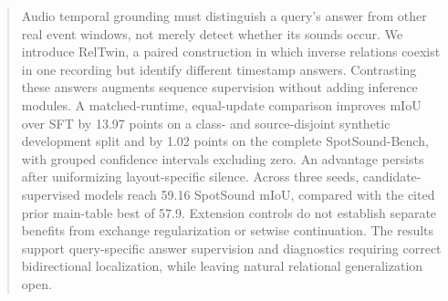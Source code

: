 \begin{abstract}
Audio temporal grounding must distinguish a query's answer from other real event windows, not merely detect whether its sounds occur. We introduce RelTwin, a paired construction in which inverse relations coexist in one recording but identify different timestamp answers. Contrasting these answers augments sequence supervision without adding inference modules. A matched-runtime, equal-update comparison improves mIoU over SFT by 13.97 points on a class- and source-disjoint synthetic development split and by 1.02 points on the complete SpotSound-Bench, with grouped confidence intervals excluding zero. An advantage persists after uniformizing layout-specific silence. Across three seeds, candidate-supervised models reach 59.16 SpotSound mIoU, compared with the cited prior main-table best of 57.9. Extension controls do not establish separate benefits from exchange regularization or setwise continuation. The results support query-specific answer supervision and diagnostics requiring correct bidirectional localization, while leaving natural relational generalization open.
\end{abstract}
